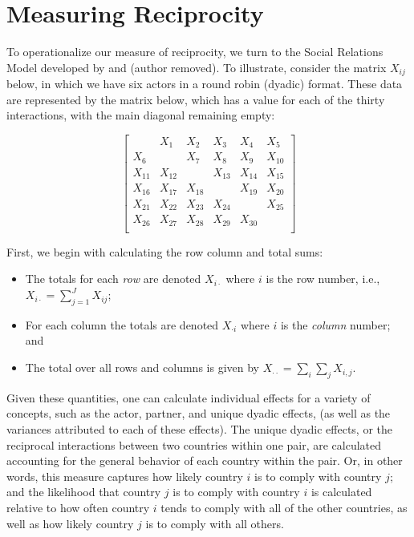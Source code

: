 \section*{Measuring Reciprocity}

To operationalize our measure of reciprocity, we turn to the Social Relations Model developed by \citet{kenny1994interpersonal} and (author removed). To illustrate, consider the matrix $X_{ij}$ below, in which we have six actors in a round robin (dyadic) format. These data are represented by the matrix below, which has a value for each of the thirty interactions, with the main diagonal remaining empty:

\singlespacing
\[
\left[
\begin{array}{cccccc}
 & X_{1}  & X_{2}  & X_{3} & X_{4} & X_{5} \\
X_{6}  &  & X_{7}  & X_{8} & X_{9} & X_{10} \\
X_{11}  & X_{12}  &    & X_{13} & X_{14} & X_{15} \\
X_{16}  & X_{17}  & X_{18}  &  & X_{19} & X_{20} \\
X_{21}  & X_{22}  & X_{23}  & X_{24} &   & X_{25} \\
X_{26}  & X_{27}  & X_{28}  & X_{29} & X_{30} &   \\
\end{array}
\right]
\]

\doublespacing
First, we begin with calculating the row column and total sums:

\begin{itemize}
	\item The totals for each \emph{ row} are denoted $X_{i \cdot}$ where $i$ is the row number, i.e.,
	~\\
	$X_{i \cdot} = \sum_{j=1}^{J} X_{ij}$;
	\item For each column the totals are denoted
	 $X_{\cdot i}$ where $i$ is the \emph{column} number; and 
	 \item The total over all rows and columns is given by $X_{\cdot \cdot} = \sum_i \sum_j X_{i,j}$.
 \end{itemize}
 
Given these quantities, one can calculate individual effects for a variety of concepts, such as the actor, partner, and unique dyadic effects, (as well as the variances attributed to each of these effects). The unique dyadic effects, or the reciprocal interactions between two countries within one pair, are calculated accounting for the general behavior of each country within the pair. Or, in other words, this measure captures how likely country $i$ is to comply with country $j$; and the likelihood that country $j$ is to comply with country $i$ is calculated relative to how often country $i$ tends to comply with all of the other countries, as well as how likely country $j$ is to comply with all others. 

